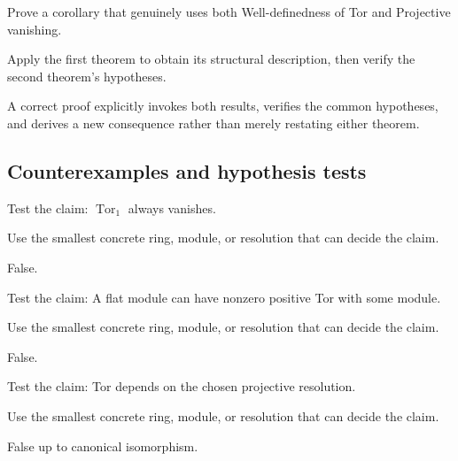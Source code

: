 \begin{exercise}\label{exr:v26-expand-09}
Prove a corollary that genuinely uses both Well-definedness of Tor and Projective vanishing.
\end{exercise}
\begin{hint}
Apply the first theorem to obtain its structural description, then verify the second theorem's hypotheses.
\end{hint}
\begin{solution}
A correct proof explicitly invokes both results, verifies the common hypotheses, and derives a new consequence rather than merely restating either theorem.
\end{solution}

\subsection*{Counterexamples and hypothesis tests}

\begin{exercise}\label{exr:v26-expand-10}
Test the claim: $\operatorname{Tor}_1$ always vanishes.
\end{exercise}
\begin{hint}
Use the smallest concrete ring, module, or resolution that can decide the claim.
\end{hint}
\begin{solution}
False.
\end{solution}

\begin{exercise}\label{exr:v26-expand-11}
Test the claim: A flat module can have nonzero positive Tor with some module.
\end{exercise}
\begin{hint}
Use the smallest concrete ring, module, or resolution that can decide the claim.
\end{hint}
\begin{solution}
False.
\end{solution}

\begin{exercise}\label{exr:v26-expand-12}
Test the claim: Tor depends on the chosen projective resolution.
\end{exercise}
\begin{hint}
Use the smallest concrete ring, module, or resolution that can decide the claim.
\end{hint}
\begin{solution}
False up to canonical isomorphism.
\end{solution}

